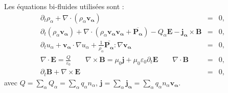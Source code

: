  Les équations bi-fluides utilisées
 sont : 
 \begin{eqnarray}
   \label{eq:model_bi_r} \partial_t \rho_{\alpha} + \nabla \cdot \left(\rho_{\alpha} \boldsymbol{v_{\alpha}}\right) &=& 0 ,\\
  \label{eq:model_bi_v} \partial_t \left(\rho_{\alpha} \boldsymbol{v_{\alpha}}\right) + \nabla \cdot \left(\rho_{\alpha} \boldsymbol{v_{\alpha}}\boldsymbol{v_{\alpha}} + \overline{\boldsymbol{P_{\alpha}}}\right) - Q_{\alpha} \boldsymbol{E} - \boldsymbol{j_{\alpha}} \times \boldsymbol{B} &=& 0 ,\\
  \label{eq:model_bi_u} \partial_t  u_{\alpha} + \boldsymbol{v_{\alpha}} \cdot \nabla u_{\alpha}   + \frac{1}{\rho_{\alpha}} \overline{\boldsymbol{P_{\alpha}}} : \nabla \boldsymbol{v_{\alpha}}   &=& 0 ,\\
\label{eq:model_bi_EB1} \nabla \cdot \boldsymbol{E} =  \frac{Q}{\varepsilon_0} \qquad \nabla \times \boldsymbol{B} = \mu_0  \boldsymbol{j} + \mu_0 \varepsilon_0 \partial_t \boldsymbol{E} \qquad \nabla \cdot \boldsymbol{B} &=& 0 , \\
\label{eq:model_bi_EB4}\partial_t \boldsymbol{B} + \nabla \times \boldsymbol{E}   &=&  0 ,
\end{eqnarray}
avec $Q = \sum_{\alpha} Q_{\alpha} =  \sum_{\alpha} q_{\alpha} n_{\alpha}$, $\boldsymbol{j} = \sum_{\alpha} \boldsymbol{j_{\alpha}} = \sum_{\alpha} q_{\alpha} n_{\alpha} \boldsymbol{v_{\alpha}}  $. 
 
